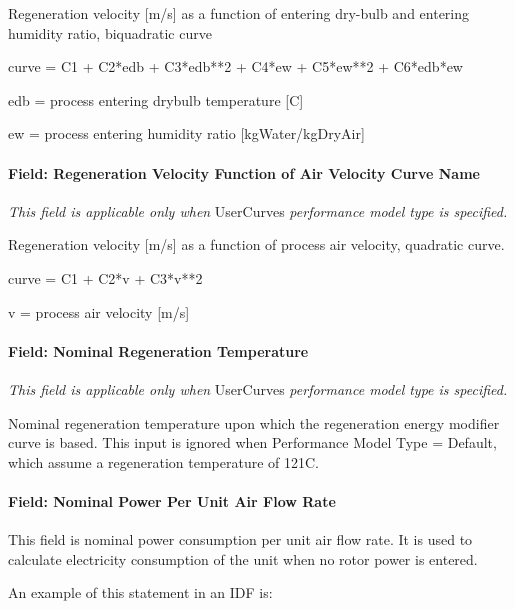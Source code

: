Regeneration velocity {[}m/s{]} as a function of entering dry-bulb and entering humidity ratio, biquadratic curve

curve = C1 + C2*edb + C3*edb**2 + C4*ew + C5*ew**2 + C6*edb*ew

edb = process entering drybulb temperature {[}C{]}

ew = process entering humidity ratio {[}kgWater/kgDryAir{]}

\paragraph{Field: Regeneration Velocity Function of Air Velocity Curve Name}\label{field-regeneration-velocity-function-of-air-velocity-curve-name}

\emph{This field is applicable only when} UserCurves \emph{performance model type is specified.}

Regeneration velocity {[}m/s{]} as a function of process air velocity, quadratic curve.

curve = C1 + C2*v + C3*v**2

v = process air velocity {[}m/s{]}

\paragraph{Field: Nominal Regeneration Temperature}\label{field-nominal-regeneration-temperature}

\emph{This field is applicable only when} UserCurves \emph{performance model type is specified.}

Nominal regeneration temperature upon which the regeneration energy modifier curve is based. This input is ignored when Performance Model Type = Default, which assume a regeneration temperature of 121C.

\paragraph{Field: Nominal Power Per Unit Air Flow Rate}\label{field-nominal-power-per-unit-air-flow-rate}

This field is nominal power consumption per unit air flow rate. It is used to calculate electricity consumption of the unit when no rotor power is entered.

An example of this statement in an IDF is:

